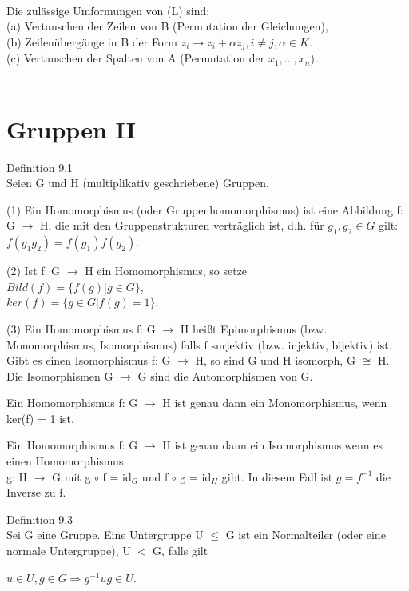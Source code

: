 \\
Die zulässige Umformungen von (L) sind:\\
(a) Vertauschen der Zeilen von B (Permutation der Gleichungen), \\
(b) Zeilenübergänge in B der Form $z_i \to z_i+\alpha z_j, i \neq j,\alpha \in K$.\\
(c) Vertauschen der Spalten von A (Permutation der $x_1, …, x_n$).\\
\\
\newpage
\section{Gruppen II}
Definition 9.1\\
Seien G und H (multiplikativ geschriebene) Gruppen.
\begin{compactenum}
\item[(1)] Ein Homomorphismus (oder Gruppenhomomorphismus) ist eine Abbildung f: G $\to$ H, die mit den Gruppenstrukturen verträglich ist, d.h. für $g_1, g_2 \in G$ gilt:\\
$f(g_1g_2) = f(g_1) f(g_2)$.
\item[(2)] Ist f: G $\to$ H ein Homomorphismus, so setze\\
$Bild(f) = \{f(g) | g \in G\}$,\\
$ker(f) = \{g \in G | f(g) = 1\}$.
\item[(3)] Ein Homomorphismus f: G $\to$ H heißt Epimorphismus (bzw. Monomorphismus, Isomorphismus) falls f surjektiv (bzw. injektiv, bijektiv) ist. Gibt es einen Isomorphismus f: G $\to$ H, so sind G und H isomorph, G $\cong$ H. Die Isomorphismen G $\to$ G sind die Automorphismen von G.
\end{compactenum}
\begin{compactitem}
\item Ein Homomorphismus f: G $\to$ H ist genau dann ein Monomorphismus, wenn ker(f) = {1} ist.
\item Ein Homomorphismus f: G $\to$ H ist genau dann ein Isomorphismus,wenn es einen Homomorphismus \\g: H $\to$ G mit g $\circ$ f = id$_G$ und f $\circ$ g = id$_H$ gibt. In diesem Fall ist $g=f^{-1}$ die Inverse zu f.\\
\end{compactitem}
Definition 9.3\\
Sei G eine Gruppe. Eine Untergruppe U $\le$ G ist ein Normalteiler (oder eine normale Untergruppe), U $\vartriangleleft$ G, falls gilt
\begin{center}
$u \in U, g \in G \Rightarrow g^{-1}ug \in U$.
\end{center}
